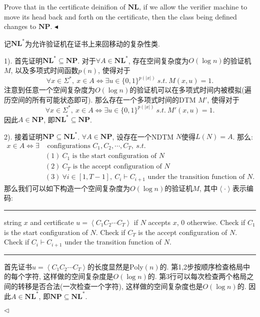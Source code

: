 \documentclass[11pt]{article}
\makeatletter
\newenvironment{breakablealgorithm}
  {%
    \begin{center}
      \refstepcounter{algorithm}%
      \hrule height.8pt depth0pt \kern2pt%
      \parskip 0pt
      \renewcommand{\caption}[2][\relax]{%
        {\raggedright\textbf{\fname@algorithm~\thealgorithm} ##2\par}%
        \ifx\relax##1\relax %
          \addcontentsline{loa}{algorithm}{\protect\numberline{\thealgorithm}##2}%
        \else %
          \addcontentsline{loa}{algorithm}{\protect\numberline{\thealgorithm}##1}%
        \fi
        \kern2pt\hrule\kern2pt
     }
  }
  {%
     \kern2pt\hrule\relax%
   \end{center}
  }
\newcommand{\NP}{\mathbf{NP}}
\newcommand{\NL}{ \mathbf{NL}}
\newcommand{\1}{\mathbf{1}}
\newenvironment{problem}[2][Problem]{\begin{trivlist}
\item[\hskip \labelsep{\bfseries#1}\hskip\labelsep{\bfseries#2.}]}{\hfill$\blacktriangleleft$\end{trivlist}}
\newenvironment{answer}[1][Answer]{\begin{trivlist}
\item[\hskip \labelsep{\bfseries\itshape#1.}\hskip \labelsep]}{\hfill$\lhd$\end{trivlist}}
\makeatother
\begin{document}
\begin{problem}{6.(20 points)}
    Prove that in the certificate deinifion of $\NL$, if we allow the verifier machine to move its head back and forth on the certificate, then the class being defined changes to $\NP$.
\end{problem}
\begin{answer}
    记$\NL^*$为允许验证机在证书上来回移动的复杂性类. 

    1). 首先证明$\NL^* \subseteq \NP$. 对于$\forall A \in \NL^*$, 存在空间复杂度为$O(\log n)$的验证机$M$, 以及多项式时间函数$p(n)$, 使得对于
    \[\forall x \in \Sigma^*,~ x \in A \iff \exists u \in \{0, 1\}^{p(|x|)} ~s.t.~ M(x, u) = 1.\]
    注意到任意一个空间复杂度为$O(\log n)$的验证机可以在多项式时间内被模拟(遍历空间的所有可能状态即可). 那么存在一个多项式时间的DTM $M'$, 使得对于
    \[\forall x \in \Sigma^*,~ x \in A \iff \exists u \in \{0, 1\}^{p(|x|)} ~s.t.~ M'(x, u) = 1.\] 
    因此$A \in \NP$, 即$\NL^* \subseteq \NP$.

    2). 接着证明$\NP \subseteq \NL^*$.  $\forall A \in \NP$, 设存在一个NDTM $N$使得$L(N) = A$. 那么:
    \begin{align*}
        x \in A \iff \exists &\text{ configurations } C_1, C_2, \cdots, C_T, ~s.t.~\\
        & (1)~ C_1 \text{ is the start configuration of } N \\
        & (2)~ C_T \text{ is the accept configuration of } N \\
        & (3)~ \forall i \in [1, T-1], ~C_i \vdash C_{i+1} \text{ under the transition function of } N.
    \end{align*}
    那么我们可以如下构造一个空间复杂度为$O(\log n)$的验证机$M$, 其中$\left\langle \cdot\right\rangle$表示编码:
    \begin{breakablealgorithm}
        \centering
        \begin{algorithmic}[1]
            \Require string $x$ and certificate $u = \left\langle C_1C_2\cdots C_T \right\rangle$
             if $N$ accepts $x$, 0 otherwise.
            \State Check if $C_1$ is the start configuration of $N$.
            \State Check if $C_T$ is the accept configuration of $N$.
                \State Check if $C_i \vdash C_{i+1}$ under the transition function of $N$.
            \EndFor
        \end{algorithmic}
    \end{breakablealgorithm}
    首先证书$u = \left\langle C_1C_2\cdots C_T \right\rangle$的长度显然是$\text{Poly}(n)$的. 第1,2步按顺序检查格局中的每个字符, 这样做的空间复杂度是$O(\log n)$的. 第3行可以每次检查两个格局之间的转移是否合法(一次检查一个字符), 这样做的空间复杂度也是$O(\log n)$的. 因此$A \in \NL^*$, 即$\NP \subseteq \NL^*$.


\end{answer}
\end{document}
